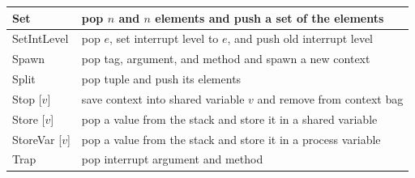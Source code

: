 \documentclass{report}
\begin{document}
{\begin{tabular}{|l|l|}
Set & pop $n$ and $n$ elements and push a set of the elements \\
\hline
SetIntLevel & pop $e$, set interrupt level to $e$, and push old interrupt level \\
\hline
Spawn & pop tag, argument, and method and spawn a new context \\
\hline
Split & pop tuple and push its elements \\
\hline
Stop [$v$] & save context into shared variable $v$ and remove from context bag \\
\hline
Store [$v$] & pop a value from the stack and store it in a shared variable \\
\hline
StoreVar [$v$] & pop a value from the stack and store it in a process variable \\
\hline
Trap & pop interrupt argument and method \\
\hline
\end{tabular}
}
\end{document}
